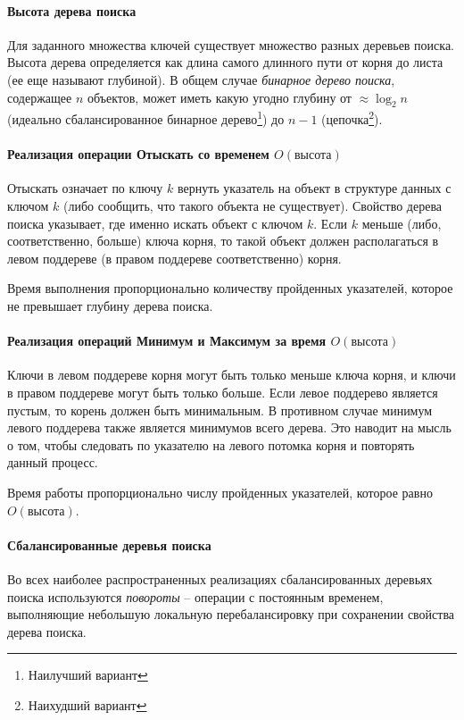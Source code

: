 \documentclass[%
	11pt,
	a4paper,
	utf8,
		]{article}
\begin{document}
\paragraph{Высота дерева поиска} Для заданного множества ключей существует множество разных деревьев поиска. Высота дерева определяется как длина самого длинного пути от корня до листа (ее еще называют глубиной). В общем случае \emph{бинарное дерево поиска}, содержащее $ n $ объектов, может иметь какую угодно глубину от $ \approx \log_2 n $ (идеально сбалансированное бинарное дерево\footnote{Наилучший вариант}) до $ n - 1 $ (цепочка\footnote{Наихудший вариант}).

\paragraph{Реализация операции Отыскать со временем $ O(\text{высота}) $} Отыскать означает по ключу $ k $ вернуть указатель на объект в структуре данных с ключом $ k $ (либо сообщить, что такого объекта не существует). Свойство дерева поиска указывает, где именно искать объект с ключом $ k $. Если $ k $ меньше (либо, соответственно, больше) ключа корня, то такой объект должен располагаться в левом поддереве (в правом поддереве соответственно) корня. 

Время выполнения пропорционально количеству пройденных указателей, которое не превышает глубину дерева поиска.

\paragraph{Реализация операций Минимум и Максимум за время $ O(\text{высота}) $} Ключи в левом поддереве корня могут быть только меньше ключа корня, и ключи в правом поддереве могут быть только больше. Если левое поддерево является пустым, то корень должен быть минимальным. В противном случае минимум левого поддерева также является минимумов всего дерева. Это наводит на мысль о том, чтобы следовать по указателю на левого потомка корня и повторять данный процесс.

Время работы пропорционально числу пройденных указателей, которое равно $ O(\text{высота}) $.

\paragraph{Сбалансированные деревья поиска} Во всех наиболее распространенных реализациях сбалансированных деревьях поиска используются \emph{повороты} -- операции с постоянным временем, выполняющие небольшую локальную перебалансировку при сохранении свойства дерева поиска.
\end{document}
